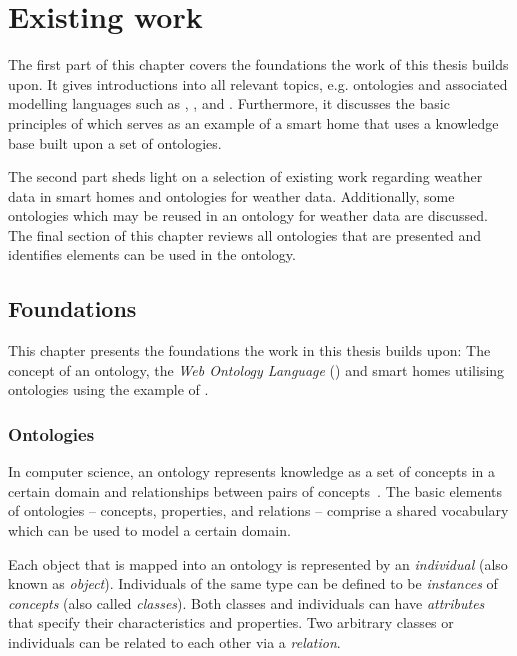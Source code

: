 \chapter{Existing work}
\label{ch:existing_work}

The first part of this chapter covers the foundations the work of this thesis builds upon. It gives introductions into all relevant topics, e.g. ontologies and associated modelling languages such as , , and . Furthermore, it discusses the basic principles of \thinkhome which serves as an example of a smart home that uses a knowledge base built upon a set of ontologies.

The second part sheds light on a selection of existing work regarding weather data in smart homes and ontologies for weather data. Additionally, some ontologies which may be reused in an ontology for weather data are discussed. The final section of this chapter reviews all ontologies that are presented and identifies elements can be used in the \smarthomeweather ontology.

\section{Foundations}

This chapter presents the foundations the work in this thesis builds upon: The concept of an ontology, the \emph{Web Ontology Language} () and smart homes utilising ontologies using the example of \thinkhome.

\subsection{Ontologies}
\label{subsec:ontologies}

In computer science, an ontology represents knowledge as a set of concepts in a certain domain and relationships between pairs of concepts~\cite{OntologiesSilverBullet}. The basic elements of ontologies -- concepts, properties, and relations -- comprise a shared vocabulary which can be used to model a certain domain.

Each object that is mapped into an ontology is represented by an \emph{individual} (also known as \emph{object}). Individuals of the same type can be defined to be \emph{instances} of \emph{concepts} (also called \emph{classes}). Both classes and individuals can have \emph{attributes} that specify their characteristics and properties. Two arbitrary classes or individuals can be related to each other via a \emph{relation}.

